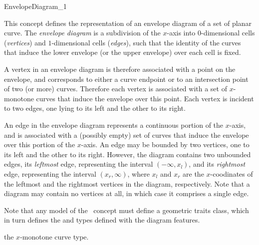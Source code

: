 
\ccRefPageBegin

\begin{ccRefConcept}{EnvelopeDiagram_1}

\ccDefinition

This concept defines the representation of an envelope diagram of a set
of planar curve. The {\em envelope diagram} is a subdivision of the $x$-axis
into $0$-dimensional cells ({\em vertices}) and $1$-dimensional cells
({\em edges}), such that the identity of the curves that induce the lower
envelope (or the upper envelope) over each cell is fixed.

A vertex in an envelope diagram is therefore associated with a point
on the envelope, and corresponds to either a curve endpoint
or to an intersection point of two (or more) curves. Therefore each vertex
is associated with a set of $x$-monotone curves that induce the envelope
over this point. Each vertex is incident to two edges, one lying to its
left and the other to its right.

An edge in the envelope diagram represents a continuous portion of the
$x$-axis, and is associated with a (possibly empty) set of curves that
induce the envelope over this portion of the $x$-axis. An edge may be bounded
by two vertices, one to its left and the other to its right. However, the
diagram contains two unbounded edges, its {\em leftmost} edge, representing
the interval $(-\infty, x_l)$, and its {\em rightmost} edge, representing the
interval $(x_r, \infty)$, where $x_l$ and $x_r$ are the $x$-coodinates of
the leftmost and the rightmost vertices in the diagram, respectively.
Note that a diagram may contain no vertices at all, in which case it
comprises a single edge.

Note that any model of the \ccRefName\ concept must define a geometric
traits class, which in turn defines the  and 
 types defined with the diagram features.

\ccTypes


\ccGlue
{}
{the $x$-monotone curve type.}


\end{ccRefConcept}
